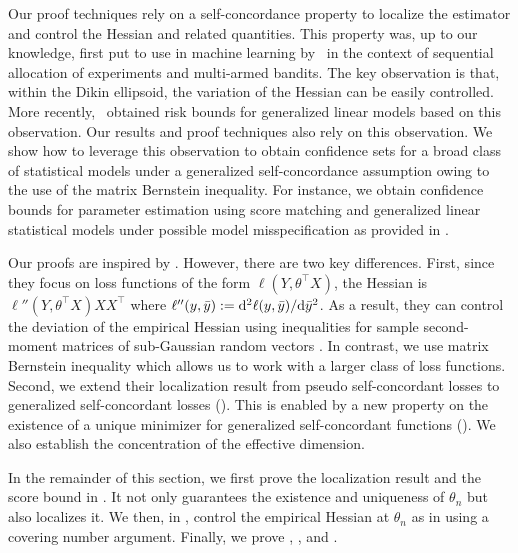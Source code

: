 Our proof techniques rely on a self-concordance property to localize the estimator and control the Hessian and related quantities. This property was, up to our knowledge, first put to use in machine learning by~\citet{abernethy2008efficient} in the context of sequential allocation of experiments and multi-armed bandits. The key observation is that, within the Dikin ellipsoid, the variation of the Hessian
can be easily controlled. More recently,~\citet{ostrovskii2021finite} obtained risk bounds for generalized linear models based on this observation.
Our results and proof techniques also rely on this observation. We show how to leverage this observation to obtain confidence sets for a broad class of statistical models under a generalized self-concordance assumption owing to the use of the matrix Bernstein inequality. For instance, we obtain confidence bounds for parameter estimation using score matching and generalized linear statistical models under possible model misspecification as provided in .

Our proofs are inspired by \citet{ostrovskii2021finite}.
However, there are two key differences.
First, since they focus on loss functions of the form $\ell(Y, \theta^\top X)$, the Hessian is $\ell''(Y, \theta^\top X) XX^\top$ where $\ell''(y, \bar y) := \mathrm{d}^2 \ell(y, \bar y) / \mathrm{d} \bar y^2$.
As a result, they can control the deviation of the empirical Hessian using inequalities for sample second-moment matrices of sub-Gaussian random vectors \citep[Thm.~A.2]{ostrovskii2021finite}.
In contrast, we use matrix Bernstein inequality which allows us to work with a larger class of loss functions.
Second, we extend their localization result from pseudo self-concordant losses to generalized self-concordant losses ().
This is enabled by a new property on the existence of a unique minimizer for generalized self-concordant functions (). We also establish the concentration of the effective dimension. 

In the remainder of this section, we first prove the localization result  and the score bound  in .
It not only guarantees the existence and uniqueness of $\theta_n$ but also localizes it.
We then, in , control the empirical Hessian at $\theta_n$ as in  using a covering number argument.
Finally, we prove , , and .

